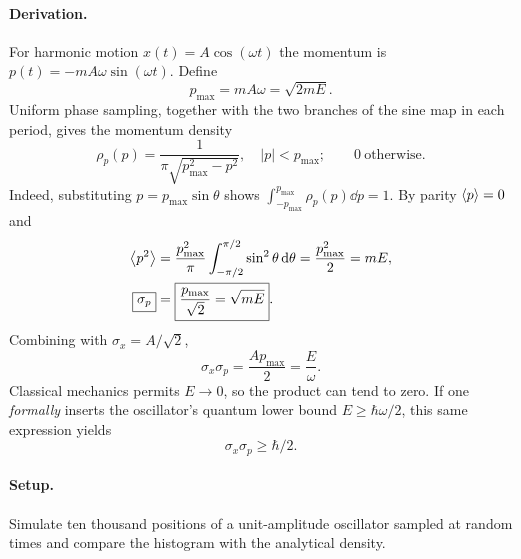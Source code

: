 \paragraph{Derivation.}
For harmonic motion $x(t)=A\cos(\omega t)$ the momentum is
$p(t)=-mA\omega\sin(\omega t)$. Define
\begin{equation}
p_{\max}=mA\omega=\sqrt{2mE}.
\end{equation}
Uniform phase sampling, together with the two branches of the sine map in each period, gives the momentum density
\begin{equation}
\boxed{\rho_p(p)=\frac1{\pi\sqrt{p_{\max}^2-p^2}},
\quad |p|<p_{\max};\qquad 0\ \text{otherwise}.}
\end{equation}
Indeed, substituting $p=p_{\max}\sin\theta$ shows
$\int_{-p_{\max}}^{p_{\max}}\rho_p(p)\dd p=1$. By parity $\left\langle p\right\rangle=0$ and
\begin{align}
\left\langle p^2\right\rangle&=\frac{p_{\max}^2}{\pi}\int_{-\pi/2}^{\pi/2}\sin^2\theta\,\mathrm{d}\theta
=\frac{p_{\max}^2}{2}=mE,\\
\boxed{\sigma_p}&=\boxed{\frac{p_{\max}}{\sqrt2}=\sqrt{mE}}.
\end{align}
Combining with $\sigma_x=A/\sqrt2$,
\begin{equation}
\boxed{\sigma_x\sigma_p=\frac{Ap_{\max}}2=\frac E\omega.}
\end{equation}
Classical mechanics permits $E\to0$, so the product can tend to zero. If one \emph{formally} inserts the oscillator's quantum lower bound $E\ge\hbar\omega/2$, this same expression yields
\begin{equation}
\sigma_x\sigma_p\ge\hbar/2.
\end{equation}

\paragraph{Setup.} Simulate ten thousand positions of a unit-amplitude oscillator sampled at random times and compare the histogram with the analytical density.
